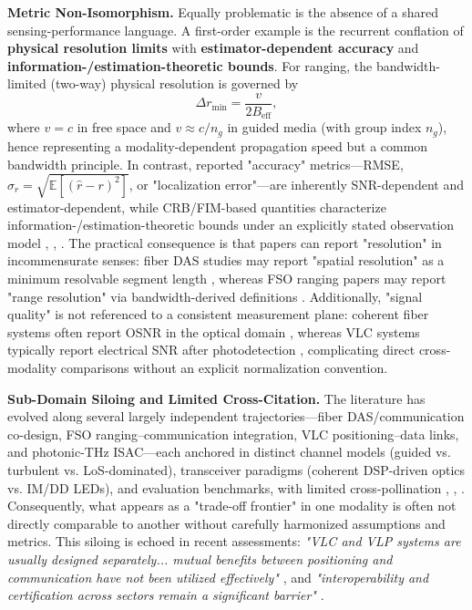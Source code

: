 \textbf{Metric Non-Isomorphism.} Equally problematic is the absence of a shared sensing-performance language. A first-order example is the recurrent conflation of \textbf{physical resolution limits} with \textbf{estimator-dependent accuracy} and \textbf{information-/estimation-theoretic bounds}. For ranging, the bandwidth-limited (two-way) physical resolution is governed by
\begin{equation}
\Delta r_{\min}=\frac{v}{2B_{\text{eff}}},
\end{equation}
where $v=c$ in free space and $v\approx c/n_g$ in guided media (with group index $n_g$), hence representing a modality-dependent propagation speed but a common bandwidth principle. In contrast, reported "accuracy" metrics---RMSE, $\sigma_r = \sqrt{\mathbb{E}[(\hat r - r)^2]}$, or "localization error"---are inherently SNR-dependent and estimator-dependent, while CRB/FIM-based quantities characterize information-/estimation-theoretic bounds under an explicitly stated observation model \cite{O_ISAC_013}, \cite{O_ISAC_050}, \cite{O_ISAC_056}. The practical consequence is that papers can report "resolution" in incommensurate senses: fiber DAS studies may report "spatial resolution" as a minimum resolvable segment length \cite{O_ISAC_013}, whereas FSO ranging papers may report "range resolution" via bandwidth-derived definitions \cite{O_ISAC_035}. Additionally, "signal quality" is not referenced to a consistent measurement plane: coherent fiber systems often report OSNR in the optical domain \cite{O_ISAC_028}, whereas VLC systems typically report electrical SNR after photodetection \cite{O_ISAC_009}, complicating direct cross-modality comparisons without an explicit normalization convention.

\textbf{Sub-Domain Siloing and Limited Cross-Citation.} The literature has evolved along several largely independent trajectories---fiber DAS/communication co-design, FSO ranging--communication integration, VLC positioning--data links, and photonic-THz ISAC---each anchored in distinct channel models (guided vs. turbulent vs. LoS-dominated), transceiver paradigms (coherent DSP-driven optics vs. IM/DD LEDs), and evaluation benchmarks, with limited cross-pollination \cite{O_ISAC_033}, \cite{O_ISAC_050}, \cite{O_ISAC_082}. Consequently, what appears as a "trade-off frontier" in one modality is often not directly comparable to another without carefully harmonized assumptions and metrics. This siloing is echoed in recent assessments: \textit{"VLC and VLP systems are usually designed separately... mutual benefits between positioning and communication have not been utilized effectively"} \cite{O_ISAC_039}, and \textit{"interoperability and certification across sectors remain a significant barrier"} \cite{O_ISAC_161}.

